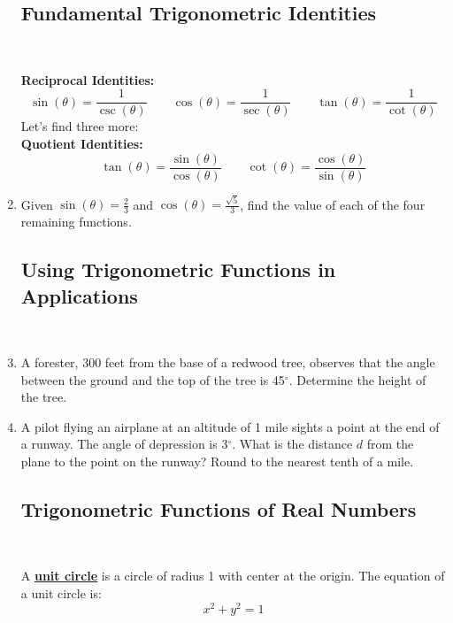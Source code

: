 \begin{enumerate}
\newpage

\subsection{Fundamental Trigonometric Identities} ~

\textbf{Reciprocal Identities:  }
$$\sin(\theta)=\frac{1}{\csc(\theta)} \quad \quad \cos(\theta)=\frac{1}{\sec(\theta)} \quad \quad \tan(\theta)=\frac{1}{\cot(\theta)}$$
Let's find three more:\\[.2in]

\textbf{Quotient Identities:  }
$$\tan(\theta)=\frac{\sin(\theta)}{\cos(\theta)} \quad \quad \cot(\theta)=\frac{\cos(\theta)}{\sin(\theta)}$$


\item Given $\sin(\theta)=\frac{2}{3}$ and $\cos(\theta)=\frac{\sqrt{5}}{3}$, find the value of each of the four remaining functions.\vfill
\vfill

\newpage
\subsection{Using Trigonometric Functions in Applications} ~

\item A forester, 300 feet from the base of a redwood tree, observes that the angle between the ground and the top of the tree is 45$^\circ$.  Determine the height of the tree.

\vfill
\item A pilot flying an airplane at an altitude of 1 mile sights a point at the end of a runway.  The angle of depression is 3$^\circ$.  What is the distance $d$ from the plane to the point on the runway?  Round to the nearest tenth of a mile.
\vfill
\vfill

\newpage
\subsection{Trigonometric Functions of Real Numbers} ~

\noindent A \textbf{\underline{unit circle}} is a circle of radius 1 with center at the origin.  The equation of a unit circle is:
$$x^2+y^2=1$$

\end{enumerate}
